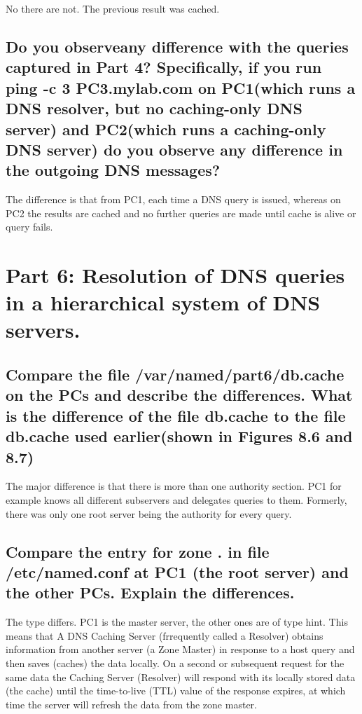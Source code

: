 \documentclass[a4paper, 11pt]{article}
\begin{document}
No there are not. The previous result was cached.

\subsection {Do you observeany difference with the queries captured in Part 4? Specifically, if you run ping -c 3 PC3.mylab.com on PC1(which runs a DNS resolver, but no caching-only DNS server) and PC2(which runs a caching-only DNS server) do you observe any difference in the outgoing DNS messages? }

The difference is that from PC1, each time a DNS query is issued, whereas on PC2 the results are cached and no further queries are made until cache is alive or query fails.

\section{Part 6: Resolution of DNS queries in a hierarchical system of DNS servers.}

\subsection{Compare the file /var/named/part6/db.cache on the PCs and describe the differences. What is the difference of the file db.cache to the file db.cache used earlier(shown in Figures 8.6 and 8.7)}

The major difference is that there is more than one authority section. PC1 for example knows all different subservers and delegates queries to them. Formerly, there was only one root server being the authority for every query.

\subsection{Compare the entry for zone . in file /etc/named.conf at PC1 (the root server) and the other PCs. Explain the differences. }

The type differs. PC1 is the master server, the other ones are of type hint. This means that A DNS Caching Server (frrequently called a Resolver) obtains information from another server (a Zone Master) in response to a host query and then saves (caches) the data locally. On a second or subsequent request for the same data the Caching Server (Resolver) will respond with its locally stored data (the cache) until the time-to-live (TTL) value of the response expires, at which time the server will refresh the data from the zone master.
\end{document}
